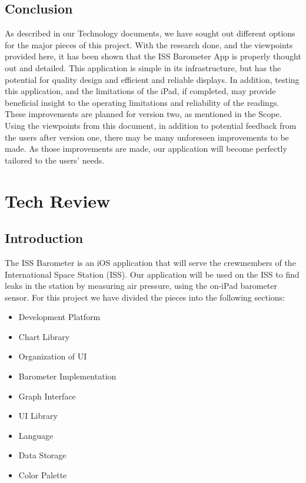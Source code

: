 \documentclass[onecolumn, draftclsnofoot,10pt, compsoc]{IEEEtran}
\def \CapstoneProjectName{ISS Barometer App }
\begin{document}
\subsection{Conclusion}
As described in our Technology documents, we have sought out different options for the major pieces of this project.
With the research done, and the viewpoints provided here, it has been shown that the \CapstoneProjectName is properly thought out and detailed.
This application is simple in its infrastructure, but has the potential for quality design and efficient and reliable displays.
In addition, testing this application, and the limitations of the iPad, if completed, may provide beneficial insight to the operating limitations and reliability of the readings.
These improvements are planned for version two, as mentioned in the Scope.
Using the viewpoints from this document, in addition to potential feedback from the users after version one, there may be many unforeseen improvements to be made.
As those improvements are made, our application will become perfectly tailored to the users' needs.




\section{Tech Review}

\subsection{Introduction}
The ISS Barometer is an iOS application that will serve the crewmembers of the International Space Station (ISS).
Our application will be used on the ISS to find leaks in the station by measuring air pressure, using the on-iPad barometer sensor.
For this project we have divided the pieces into the following sections:

\begin{itemize}
\item Development Platform
\item Chart Library
\item Organization of UI
\item Barometer Implementation
\item Graph Interface
\item UI Library
\item Language
\item Data Storage
\item Color Palette
\end{itemize}
\end{document}
